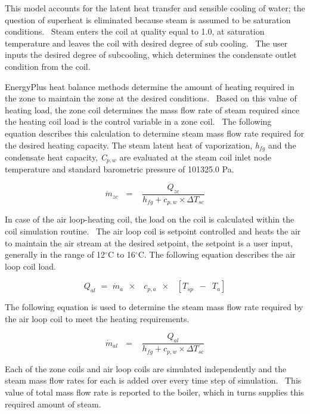 This model accounts for the latent heat transfer and sensible cooling of water; the question of superheat is eliminated because steam is assumed to be saturation conditions.~ Steam enters the coil at quality equal to 1.0, at saturation temperature and leaves the coil with desired degree of sub cooling.~ The user inputs the desired degree of subcooling, which determines the condensate outlet condition from the coil.

EnergyPlus heat balance methods determine the amount of heating required in the zone to maintain the zone at the desired conditions.~ Based on this value of heating load, the zone coil determines the mass flow rate of steam required since the heating coil load is the control variable in a zone coil.~ The following equation describes this calculation to determine steam mass flow rate required for the desired heating capacity. The steam latent heat of vaporization, \emph{h}\(_{fg}\) and the condensate heat capacity, \emph{C}\(_{p,w}\) are evaluated at the steam coil inlet node temperature and standard barometric pressure of 101325.0 Pa.

\begin{equation}
{\dot m_{zc}}\,\,\,\, = \,\,\,\,\,\frac{{{Q_{zc}}}}{{{h_{fg}} + {c_{p,w}} \times \Delta {T_{sc}}}}
\end{equation}

In case of the air loop-heating coil, the load on the coil is calculated within the coil simulation routine.~ The air loop coil is setpoint controlled and heats the air to maintain the air stream at the desired setpoint, the setpoint is a user input, generally in the range of 12\(^{\circ}\)C to 16\(^{\circ}\)C. The following equation describes the air loop coil load.

\begin{equation}
{Q_{al}}\,\, = \,\,{\dot m_a}\,\,\, \times \,\,\,\,\,{c_{p,a}}\,\,\, \times \,\,\,\,\,\left[ {{T_{sp}}\,\,\, - \,\,\,{T_a}} \right]
\end{equation}

The following equation is used to determine the steam mass flow rate required by the air loop coil to meet the heating requirements.

\begin{equation}
{\dot m_{al}}\,\,\,\, = \,\,\,\,\,\frac{{{Q_{al}}}}{{{h_{fg}} + {c_{p,w}} \times \Delta {T_{sc}}}}
\end{equation}

Each of the zone coils and air loop coils are simulated independently and the steam mass flow rates for each is added over every time step of simulation.~ This value of total mass flow rate is reported to the boiler, which in turns supplies this required amount of steam.

